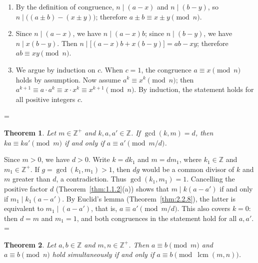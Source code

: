 \documentclass[11pt]{article}
\makeatletter
\let\nt@closedisplay\]
\def\nt@guardedclose{\@ifnextchar\par{\nt@closeafterpar}{\@ifnextchar\end{\postdisplaypenalty\@M\nt@closedisplay}{\nt@closedisplay}}}
\def\nt@closeafterpar\par{\@ifnextchar\par{\nt@closeafterpar}{\@ifnextchar\end{\postdisplaypenalty\@M\nt@closedisplay\par}{\nt@closedisplay\par}}}
\renewenvironment{proof}[1][\proofname]{\par
  \pushQED{\qed}\normalfont\topsep\medskipamount\edef\nt@afterproof{\@endparpenalty=\the\@endparpenalty\relax}\@beginparpenalty\@M\@endparpenalty\@M\let\]\nt@guardedclose\trivlist\item[]\textit{#1\@addpunct{.}} \ignorespaces}{\ifvmode\addpenalty\@M\fi\popQED\nt@afterproof\endtrivlist\@endpefalse}
\theoremstyle{ntstyle}
\newtheorem{theorem}{Theorem}[subsection]
\DeclareMathOperator{\lcm}{lcm}
\makeatother
\begin{document}
\begin{proof}

  \begin{enumerate}[label={\alph*)}]
    \item By the definition of congruence, $n \mid (a - x)$ and $n \mid (b - y)$, so
    $n \mid \big((a \pm b) - (x \pm y)\big)$; therefore $a \pm b \equiv x \pm y \pmod{n}$.
    \item Since $n \mid (a-x)$, we have $n \mid (a-x)b$; since $n \mid (b - y)$, we have $n \mid x(b-y)$. Then
    $n \mid \big[(a-x)b + x(b-y)\big] = ab - xy$;
          therefore $ab \equiv xy \pmod{n}$.
    \item We argue by induction on $c$. When $c = 1$, the congruence $a \equiv x \pmod{n}$ holds by assumption. Now
    assume $a^{k} \equiv x^{k} \pmod{n}$; then
    $a^{k+1} \equiv a \cdot a^{k} \equiv x \cdot x^{k} \equiv x^{k+1} \pmod{n}$. By induction, the statement
          holds for all positive integers $c$.\qedhere
\end{enumerate}
\end{proof}

\begin{theorem}\label{thm:3.1.2}
  Let $m \in \mathbb{Z}^+$ and $k, a, a' \in \mathbb{Z}$. If $\gcd(k, m) = d$, then $ka \equiv ka' \pmod{m}$ if and
  only if $a \equiv a' \pmod{m/d}$.

\end{theorem}

\begin{proof} Since $m>0$, we have $d>0$. Write $k=dk_1$ and
  $m=dm_1$, where $k_1\in\mathbb{Z}$ and $m_1\in\mathbb{Z}^+$.
  If $g=\gcd(k_1,m_1)>1$, then $dg$ would be a common divisor of $k$
  and $m$ greater than $d$, a contradiction. Thus $\gcd(k_1,m_1)=1$.
  Cancelling the positive factor $d$ (Theorem~\ref{thm:1.1.2}(a)) shows that
  $m\mid k(a-a')$ if and only if $m_1\mid k_1(a-a')$.
  By Euclid's lemma (Theorem~\ref{thm:2.2.8}), the latter is equivalent to
  $m_1\mid(a-a')$, that is, $a\equiv a'\pmod{m/d}$.
  This also covers $k=0$: then $d=m$ and $m_1=1$, and both congruences
  in the statement hold for all $a,a'$.
\end{proof}

\begin{theorem}\label{thm:3.1.3} Let $a, b \in \mathbb{Z}$ and $m, n \in \mathbb{Z}^+$. Then $a \equiv b \pmod{m}$
  and $a \equiv b \pmod{n}$ hold simultaneously if and only if $a \equiv b \pmod{\lcm(m, n)}$.

\end{theorem}
\end{document}
